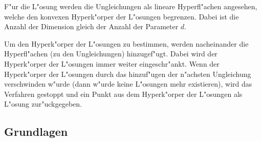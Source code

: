 F"ur die L"osung werden die Ungleichungen als lineare Hyperfl"achen angesehen, welche den konvexen Hyperk"orper der L"osungen begrenzen. Dabei ist die Anzahl der Dimension gleich der Anzahl der Parameter $d$.

Um den Hyperk"orper der L"osungen zu bestimmen, werden nacheinander die Hyperfl"achen (zu den Ungleichungen) hinzugef"ugt. Dabei wird der Hyperk"orper der L"osungen immer weiter eingeschr"ankt. Wenn der Hyperk"orper der L"osungen durch das hinzuf"ugen der n"achsten Ungleichung verschwinden w"urde (dann w"urde keine L"osungen mehr existieren), wird das Verfahren gestoppt und ein Punkt aus dem Hyperk"orper der L"osungen als L"osung zur"uckgegeben.


\subsection{Grundlagen}

